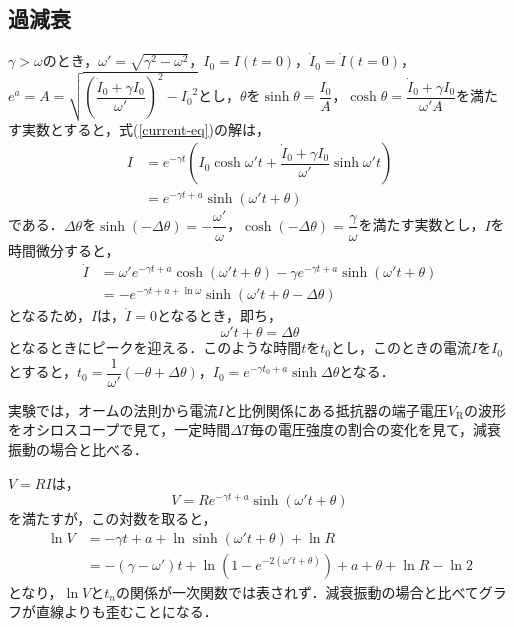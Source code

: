 \documentclass[uplatex,dvipdfmx,a4paper,10pt]{jsarticle}
\begin{document}
\subsection{過減衰}\label{sec:OD}
$\gamma > \omega$のとき，$\omega'=\sqrt{\gamma^2 - \omega^2}$，$I_0=I(t=0)$，$\dot{I}_0=\dot{I}(t=0)$，$e^a=A=\sqrt{\left( {\dfrac{\dot{I}_0+\gamma I_0}{\omega'}} \right)^2 - {I_0}^2}$とし，$\theta$を$\sinh{\theta}=\dfrac{I_0}{A}$，$\cosh{\theta}=\dfrac{\dot{I}_0+\gamma I_0}{\omega'A}$を満たす実数とすると，式(\ref{current-eq})の解は，
\begin{align}
    I &= e^{-\gamma t}\left( I_0\cosh{\omega't} + \dfrac{\dot{I}_0+\gamma I_0}{\omega'}\sinh{\omega't}\right)\\
    &= e^{-\gamma t + a} \sinh\left( \omega't + \theta \right)
\end{align}
である．$\Delta\theta$を$\sinh{\left( -\Delta\theta \right)}=-\dfrac{\omega'}{\omega}$，$\cosh{\left( -\Delta\theta \right)}=\dfrac{\gamma}{\omega}$を満たす実数とし，$I$を時間微分すると，
\begin{align}
    \dot{I} &= \omega' e^{-\gamma t + a} \cosh\left( \omega't + \theta \right) - \gamma e^{-\gamma t + a} \sinh\left( \omega't + \theta \right)\\
    &= -e^{-\gamma t + a + \ln{\omega}} \sinh\left( \omega't + \theta - \Delta\theta\right)
\end{align}
となるため，$I$は，$\dot{I}=0$となるとき，即ち，
\begin{equation}
    \omega't + \theta = \Delta\theta
\end{equation}
となるときにピークを迎える．このような時間$t$を$t_0$とし，このときの電流$I$を$I_0$とすると，$t_0 = \dfrac{1}{\omega'}\left( -\theta + \Delta\theta\right)$，$I_0 = e^{-\gamma t_0 + a} \sinh \Delta\theta $となる．

実験では，オームの法則から電流$I$と比例関係にある抵抗器の端子電圧$V_\mathrm{R}$の波形をオシロスコープで見て，一定時間$\Delta T$毎の電圧強度の割合の変化を見て，減衰振動の場合と比べる．

$V=RI$は，
\begin{equation}
    V = Re^{-\gamma t + a} \sinh\left( \omega't + \theta \right)
\end{equation}
を満たすが，この対数を取ると，
\begin{align}
    \ln{V} &= -\gamma t + a + \ln{\sinh\left( \omega't + \theta \right)} + \ln{R}\\
    &= -\left( \gamma - \omega' \right)t + \ln{\left( 1-e^{-2\left( \omega't + \theta \right)} \right)} + a + \theta + \ln{R} - \ln{2} \label{eq:ODlnV}
\end{align}
となり，$\ln{V}$と$t_n$の関係が一次関数では表されず．減衰振動の場合と比べてグラフが直線よりも歪むことになる．
\end{document}
